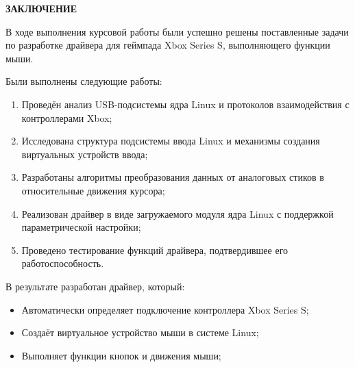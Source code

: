 \begin{center}
    \textbf{ЗАКЛЮЧЕНИЕ}
\end{center}

В ходе выполнения курсовой работы были успешно решены поставленные задачи по разработке драйвера для геймпада Xbox Series S, выполняющего функции мыши.

Были выполнены следующие работы:
\begin{enumerate}
	\item Проведён анализ USB-подсистемы ядра Linux и протоколов взаимодействия с контроллерами Xbox;
	\item Исследована структура подсистемы ввода Linux и механизмы создания виртуальных устройств ввода;
	\item Разработаны алгоритмы преобразования данных от аналоговых стиков в относительные движения курсора;
	\item Реализован драйвер в виде загружаемого модуля ядра Linux с поддержкой параметрической настройки;
	\item Проведено тестирование функций драйвера, подтвердившее его работоспособность.
\end{enumerate}

В результате разработан драйвер, который:
\begin{itemize}[label=---]
	\item Автоматически определяет подключение контроллера Xbox Series S;
	\item Создаёт виртуальное устройство мыши в системе Linux;
	\item Выполняет функции кнопок и движения мыши;
\end{itemize}
